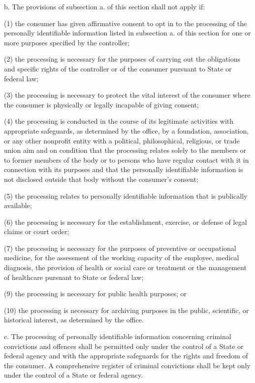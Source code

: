      b.    The provisions of subsection a. of this section shall not apply if:

     (1)   the consumer has given affirmative consent to opt in to the processing of the personally identifiable information listed in subsection a. of this section for one or more purposes specified by the controller;

     (2)   the processing is necessary for the purposes of carrying out the obligations and specific rights of the controller or of the consumer pursuant to State or federal law;

     (3)   the processing is necessary to protect the vital interest of the consumer where the consumer is physically or legally incapable of giving consent;

     (4)   the processing is conducted in the course of its legitimate activities with appropriate safeguards, as determined by the office, by a foundation, association, or any other nonprofit entity with a political, philosophical, religious, or trade union aim and on condition that the processing relates solely to the members or to former members of the body or to persons who have regular contact with it in connection with its purposes and that the personally identifiable information is not disclosed outside that body without the consumer's consent;

     (5)   the processing relates to personally identifiable information that is publically available;

     (6)   the processing is necessary for the establishment, exercise, or defense of legal claims or court order;

     (7)   the processing is necessary for the purposes of preventive or occupational medicine, for the assessment of the working capacity of the employee, medical diagnosis, the provision of health or social care or treatment or the management of healthcare pursuant to State or federal law;

     (9)   the processing is necessary for public health purposes; or

     (10) the processing is necessary for archiving purposes in the public, scientific, or historical interest, as determined by the office.

     c.     The processing of personally identifiable information concerning criminal convictions and offences shall be permitted only under the control of a State or federal agency and with the appropriate safeguards for the rights and freedom of the consumer. A comprehensive register of criminal convictions shall be kept only under the control of a State or federal agency.

